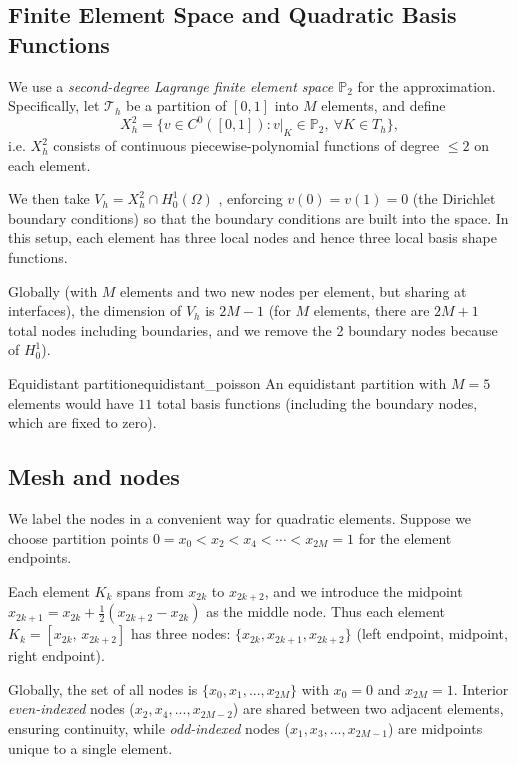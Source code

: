 \documentclass[a4paper,10pt]{report}
\begin{document}
\subsection{Finite Element Space and Quadratic Basis Functions}
We use a \emph{second-degree Lagrange finite element space \(\mathbb{P}_2\)} for the approximation.
Specifically, let \(\mathcal{T}_h\) be a partition of \([0,1]\) into \(M\) elements, and define
\[
	X_h^2 = \{ v \in C^0([0,1]) : v|_{K} \in \mathbb{P}_2,\ \forall K \in T_h\},
\]
i.e. \(X_h^2\) consists of continuous piecewise-polynomial functions of degree \(\le 2\) on each element.

We then take \(V_h = X_h^2 \cap H^1_0(\Omega)\) , enforcing \(v(0)=v(1)=0\) (the Dirichlet boundary conditions) so that the boundary conditions are built into the space.
In this setup, each element has three local nodes and hence three local basis shape functions.

Globally (with \(M\) elements and two new nodes per element, but sharing at interfaces), the dimension of \(V_h\) is \(2M-1\) (for \(M\) elements, there are \(2M+1\) total nodes including boundaries, and we remove the 2 boundary nodes because of \(H^1_0\)).

\begin{example}{Equidistant partition}{equidistant_poisson}
	An equidistant partition with \(M=5\) elements would have \(11\) total basis functions (including the boundary nodes, which are fixed to zero).
\end{example}

\subsection*{Mesh and nodes}
We label the nodes in a convenient way for quadratic elements.
Suppose we choose partition points \(0 = x_0 < x_2 < x_4 < \cdots < x_{2M} = 1\) for the element endpoints.

Each element \(K_k\) spans from \(x_{2k}\) to \(x_{2k+2}\), and we introduce the midpoint \(x_{2k+1} = x_{2k} + \frac{1}{2}(x_{2k+2}-x_{2k})\) as the middle node.
Thus each element \(K_k = [x_{2k},\,x_{2k+2}]\) has three nodes: \(\{x_{2k}, x_{2k+1}, x_{2k+2}\}\) (left endpoint, midpoint, right endpoint).

Globally, the set of all nodes is \(\{x_0, x_1, ..., x_{2M}\}\) with \(x_0=0\) and \(x_{2M}=1\).
Interior \emph{even-indexed} nodes (\(x_2, x_4, ..., x_{2M-2}\)) are shared between two adjacent elements, ensuring continuity, while \textit{odd-indexed} nodes (\(x_1, x_3, ..., x_{2M-1}\)) are midpoints unique to a single element.
\end{document}
